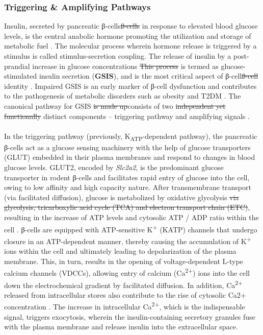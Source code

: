 \subsubsection{Triggering \& Amplifying Pathways}
Insulin, secreted by pancreatic β-cells\st{ß-cells} in response to elevated blood glucose levels, is the central anabolic hormone promoting the utilization and storage of metabolic fuel \textbf{\cite{slack_developmental_1995}}. The molecular process wherein hormone release is triggered by a stimulus is called stimulus-secretion coupling.  The release of insulin by a post-prandial increase in glucose concentrations \st{This process} is termed as glucose-stimulated insulin secretion (\textbf{GSIS}), and is the most critical aspect of β-cell\st{ß-cell} identity \textbf{\cite{ashcroft_stimulussecretion_1994}}.  Impaired GSIS is an early marker of β-cell dysfunction and contributes to the pathogenesis of metabolic disorders such as obesity and T2DM \textbf{\cite{jensen_metabolic_2008}}. The canonical pathway for GSIS \st{is made up}consists of two \st{independent yet functionally }distinct components – triggering pathway and amplifying signals \textbf{\cite{henquin_triggering_2000}}. 
\\\\
In the triggering pathway (previously, K\textsubscript{ATP}-dependent pathway), the pancreatic β-cells act as a glucose sensing machinery with the help of glucose transporters (GLUT) embedded in their plasma membranes and respond to changes in blood glucose levels. GLUT2, encoded by \textit{Slc2a2}, is the predominant glucose transporter in rodent β-cells \textbf{\cite{mcculloch_glut2_2011,van_de_bunt_tale_2012}}   and facilitates rapid entry of glucose into the cell, owing to low affinity and high capacity nature. After transmembrane transport (via facilitated diffusion), glucose is metabolized by oxidative glycolysis\st{ via glycolysis, tricarboxylic acid cycle (TCA) and electron transport chain (ETC)}, resulting in the increase of ATP levels and cytosolic ATP / ADP ratio within the cell \textbf{\cite{henquin_triggering_2000}}. β-cells are equipped with ATP-sensitive K\textsuperscript{+} (KATP) channels that undergo closure in an ATP-dependent manner, thereby causing the accumulation of K\textsuperscript{+} ions within the cell and ultimately leading to depolarization of the plasma membrane. This, in turn, results in the opening of voltage-dependent L-type calcium channels (VDCCs), allowing entry of calcium (Ca\textsuperscript{2+}) ions into the cell down the electrochemical gradient by facilitated diffusion. In addition, Ca\textsuperscript{2+} released from intracellular stores also contribute to the rise of cytosolic Ca2+ concentration \textbf{\cite{yang_ionic_2014}}. The increase in intracellular Ca\textsuperscript{2+}, which is the indispensable signal, triggers exocytosis, wherein the insulin-containing secretory granules fuse with the plasma membrane and release insulin into the extracellular space.
